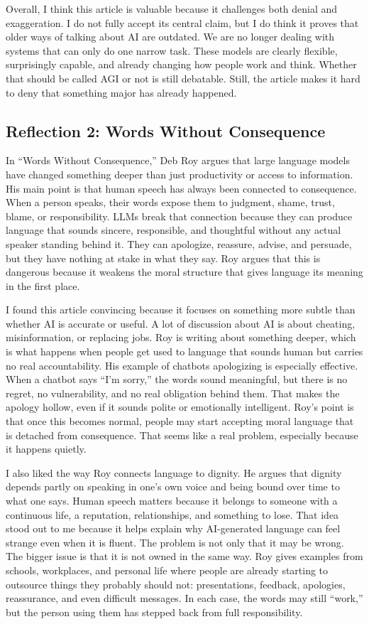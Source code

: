 \documentclass{article}
\begin{document}
Overall, I think this article is valuable because it challenges both denial and exaggeration. I do not fully accept its central claim, but I do think it proves that older ways of talking about AI are outdated. We are no longer dealing with systems that can only do one narrow task. These models are clearly flexible, surprisingly capable, and already changing how people work and think. Whether that should be called AGI or not is still debatable. Still, the article makes it hard to deny that something major has already happened.

\clearpage
\subsection*{Reflection 2: Words Without Consequence}
In “Words Without Consequence,” Deb Roy argues that large language models have changed something deeper than just productivity or access to information. His main point is that human speech has always been connected to consequence. When a person speaks, their words expose them to judgment, shame, trust, blame, or responsibility. LLMs break that connection because they can produce language that sounds sincere, responsible, and thoughtful without any actual speaker standing behind it. They can apologize, reassure, advise, and persuade, but they have nothing at stake in what they say. Roy argues that this is dangerous because it weakens the moral structure that gives language its meaning in the first place.

I found this article convincing because it focuses on something more subtle than whether AI is accurate or useful. A lot of discussion about AI is about cheating, misinformation, or replacing jobs. Roy is writing about something deeper, which is what happens when people get used to language that sounds human but carries no real accountability. His example of chatbots apologizing is especially effective. When a chatbot says “I’m sorry,” the words sound meaningful, but there is no regret, no vulnerability, and no real obligation behind them. That makes the apology hollow, even if it sounds polite or emotionally intelligent. Roy’s point is that once this becomes normal, people may start accepting moral language that is detached from consequence. That seems like a real problem, especially because it happens quietly.

I also liked the way Roy connects language to dignity. He argues that dignity depends partly on speaking in one’s own voice and being bound over time to what one says. Human speech matters because it belongs to someone with a continuous life, a reputation, relationships, and something to lose. That idea stood out to me because it helps explain why AI-generated language can feel strange even when it is fluent. The problem is not only that it may be wrong. The bigger issue is that it is not owned in the same way. Roy gives examples from schools, workplaces, and personal life where people are already starting to outsource things they probably should not: presentations, feedback, apologies, reassurance, and even difficult messages. In each case, the words may still “work,” but the person using them has stepped back from full responsibility.
\end{document}
